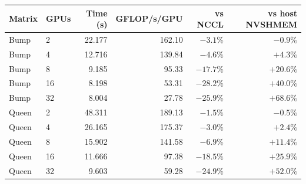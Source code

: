 \begin{tabular}{llrrrr}
\toprule
Matrix & GPUs & Time (s) & GFLOP/s/GPU & vs NCCL & vs host NVSHMEM\\
\midrule
Bump & 2 & 22.177 & 162.10 & $-3.1\%$ & $-0.9\%$\\
Bump & 4 & 12.716 & 139.84 & $-4.6\%$ & $+4.3\%$\\
Bump & 8 & 9.185 & 95.33 & $-17.7\%$ & $+20.6\%$\\
Bump & 16 & 8.198 & 53.31 & $-28.2\%$ & $+40.0\%$\\
Bump & 32 & 8.004 & 27.78 & $-25.9\%$ & $+68.6\%$\\
Queen & 2 & 48.311 & 189.13 & $-1.5\%$ & $-0.5\%$\\
Queen & 4 & 26.165 & 175.37 & $-3.0\%$ & $+2.4\%$\\
Queen & 8 & 15.902 & 141.58 & $-6.9\%$ & $+11.4\%$\\
Queen & 16 & 11.666 & 97.38 & $-18.5\%$ & $+25.9\%$\\
Queen & 32 & 9.603 & 59.28 & $-24.9\%$ & $+52.0\%$\\
\bottomrule
\end{tabular}
